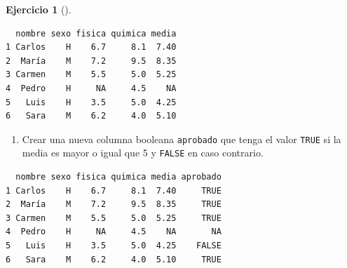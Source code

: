 \documentclass[
  a4paper,
]{scrreport}
\newenvironment{Shaded}{\begin{snugshade}}{\end{snugshade}}
\newcommand{\DecValTok}[1]{\textcolor[rgb]{0.68,0.00,0.00}{#1}}
\newcommand{\NormalTok}[1]{\textcolor[rgb]{0.00,0.23,0.31}{#1}}
\newcommand{\OtherTok}[1]{\textcolor[rgb]{0.00,0.23,0.31}{#1}}
\newcommand{\SpecialCharTok}[1]{\textcolor[rgb]{0.37,0.37,0.37}{#1}}
\providecommand{\tightlist}{%
  \setlength{\itemsep}{0pt}\setlength{\parskip}{0pt}}\usepackage{longtable,booktabs,array}
\theoremstyle{definition}
\newtheorem{exercise}{Ejercicio}[chapter]
\theoremstyle{remark}
\begin{document}
\begin{exercise}[]
\begin{tcolorbox}
\begin{Shaded}
\end{Shaded}

\begin{verbatim}
  nombre sexo fisica quimica media
1 Carlos    H    6.7     8.1  7.40
2  María    M    7.2     9.5  8.35
3 Carmen    M    5.5     5.0  5.25
4  Pedro    H     NA     4.5    NA
5   Luis    H    3.5     5.0  4.25
6   Sara    M    6.2     4.0  5.10
\end{verbatim}

\end{tcolorbox}

\begin{enumerate}
\def\labelenumi{\alph{enumi}.}
\setcounter{enumi}{4}
\tightlist
\item
  Crear una nueva columna booleana \texttt{aprobado} que tenga el valor
  \texttt{TRUE} si la media es mayor o igual que 5 y \texttt{FALSE} en
  caso contrario.
\end{enumerate}

\begin{tcolorbox}[enhanced jigsaw, title=\textcolor{quarto-callout-tip-color}{\faLightbulb}\hspace{0.5em}{Solución}, coltitle=black, opacitybacktitle=0.6, rightrule=.15mm, colback=white, bottomtitle=1mm, breakable, leftrule=.75mm, opacityback=0, colbacktitle=quarto-callout-tip-color!10!white, left=2mm, colframe=quarto-callout-tip-color-frame, toptitle=1mm, titlerule=0mm, arc=.35mm, bottomrule=.15mm, toprule=.15mm]

\begin{Shaded}
\end{Shaded}

\begin{verbatim}
  nombre sexo fisica quimica media aprobado
1 Carlos    H    6.7     8.1  7.40     TRUE
2  María    M    7.2     9.5  8.35     TRUE
3 Carmen    M    5.5     5.0  5.25     TRUE
4  Pedro    H     NA     4.5    NA       NA
5   Luis    H    3.5     5.0  4.25    FALSE
6   Sara    M    6.2     4.0  5.10     TRUE
\end{verbatim}


\end{tcolorbox}
\end{exercise}
\end{document}
